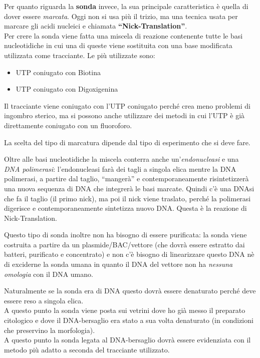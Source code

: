 \documentclass[11pt]{book}
\begin{document}
Per quanto riguarda la \textbf{sonda} invece, la sua principale caratteristica è quella di dover essere \emph{marcata}. Oggi non si usa più il trizio, ma una tecnica usata per marcare gli acidi nucleici e chiamata \textbf{``Nick-Translation''}.\\
Per crere la sonda viene fatta una miscela di reazione contenente tutte le basi nucleotidiche in cui una di queste viene sostituita con una base modificata utilizzata come tracciante. Le più utilizzate sono:
\begin{itemize}
\item UTP coniugato con Biotina
\item UTP coniugato con Digoxigenina
\end{itemize}
Il tracciante viene coniugato con l’UTP coniugato perché crea meno problemi di ingombro sterico, ma si possono anche utilizzare dei metodi in cui l’UTP è già direttamente coniugato con un fluoroforo.

La scelta del tipo di marcatura dipende dal tipo di esperimento che si deve fare.

Oltre alle basi nucleotidiche la miscela conterra anche un'\emph{endonucleasi} e una \emph{DNA polimerasi}: l'endonucleasi farà dei tagli a singola elica mentre la DNA polimerasi, a partire dal taglio, ``mangerà'' e contemporaneamente risintetizzerà una nuova sequenza di DNA che integrerà le basi marcate.
Quindi c’è una DNAsi che fa il taglio (il primo nick), ma poi il nick viene traslato, perché la polimerasi digerisce e contemporaneamente sintetizza nuovo DNA. Questa è la reazione di Nick-Translation. 

Questo tipo di sonda inoltre non ha bisogno di essere purificata: la sonda viene costruita a partire da un plasmide/BAC/vettore (che dovrà essere estratto dai batteri, purificato e concentrato) e non c'è bisogno di linearizzare questo DNA nè di exciderne la sonda umana in quanto il DNA del vettore non ha \emph{nessuna omologia} con il DNA umano.

Naturalmente se la sonda era di DNA questo dovrà essere denaturato perché deve essere reso a singola elica.\\
A questo punto la sonda viene posta sui vetrini dove ho già messo il preparato citologico e dove il DNA-bersaglio era stato a sua volta denaturato (in condizioni che preservino la morfologia).\\ 
A questo punto la sonda legata al DNA-bersaglio dovrà essere evidenziata con il metodo più adatto a seconda del tracciante utilizzato.
\end{document}
